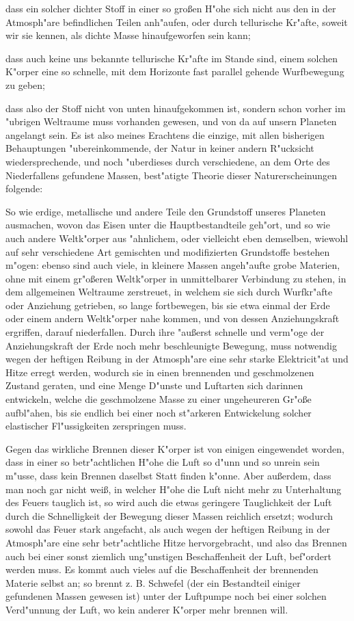 \documentclass[a4paper, 11pt, oneside, polutonikogreek, german]{article}
\begin{document}
dass ein solcher dichter Stoff in einer so großen H"ohe sich nicht aus den in der Atmosph"are befindlichen Teilen anh"aufen, oder durch tellurische Kr"afte, soweit wir sie kennen, als dichte Masse hinaufgeworfen sein kann;

dass auch keine uns bekannte tellurische Kr"afte im Stande sind, einem solchen K"orper eine so schnelle, mit dem Horizonte fast parallel gehende Wurfbewegung zu geben;

dass also der Stoff nicht von unten hinaufgekommen ist, sondern schon vorher im "ubrigen Weltraume muss vorhanden gewesen, und von da auf unsern Planeten angelangt sein. Es ist also meines Erachtens die einzige, mit allen bisherigen Behauptungen "ubereinkommende, der Natur in keiner andern R"ucksicht wiedersprechende, und noch "uberdieses durch verschiedene, an dem Orte des Niederfallens gefundene Massen, best"atigte Theorie dieser Naturerscheinungen folgende:

So wie erdige, metallische und andere Teile den Grundstoff unseres Planeten ausmachen, wovon das Eisen unter die Hauptbestandteile geh"ort, und so wie auch andere Weltk"orper aus "ahnlichem, oder vielleicht eben demselben, wiewohl auf sehr verschiedene Art gemischten und modifizierten Grundstoffe bestehen m"ogen: ebenso sind auch viele, in kleinere Massen angeh"aufte grobe Materien, ohne mit einem gr"oßeren Weltk"orper in unmittelbarer Verbindung zu stehen, in dem allgemeinen Weltraume zerstreuet, in welchem sie sich durch Wurfkr"afte oder Anziehung getrieben, so lange fortbewegen, bis sie etwa einmal der Erde oder einem andern Weltk"orper nahe kommen, und von dessen Anziehungskraft ergriffen, darauf niederfallen. Durch ihre "außerst schnelle und verm"oge der Anziehungskraft der Erde noch mehr beschleunigte Bewegung, muss notwendig wegen der heftigen Reibung in der Atmosph"are eine sehr starke Elektricit"at und Hitze erregt werden, wodurch sie in einen brennenden und geschmolzenen Zustand geraten, und eine Menge D"unste und Luftarten sich darinnen entwickeln, welche die geschmolzene Masse zu einer ungeheureren Gr"oße aufbl"ahen, bis sie endlich bei einer noch st"arkeren Entwickelung solcher elastischer Fl"ussigkeiten zerspringen muss.

Gegen das wirkliche Brennen dieser K"orper ist von einigen eingewendet worden, dass in einer so betr"achtlichen H"ohe die Luft so d"unn und so unrein sein m"usse, dass kein Brennen daselbst Statt finden k"onne. Aber außerdem, dass man noch gar nicht weiß, in welcher H"ohe die Luft nicht mehr zu Unterhaltung des Feuers tauglich ist, so wird auch die etwas geringere Tauglichkeit der Luft durch die Schnelligkeit der Bewegung dieser Massen reichlich ersetzt; wodurch sowohl das Feuer stark angefacht, als auch wegen der heftigen Reibung in der Atmosph"are eine sehr betr"achtliche Hitze hervorgebracht, und also das Brennen auch bei einer sonst ziemlich ung"unstigen Beschaffenheit der Luft, bef"ordert werden muss. Es kommt auch vieles auf die Beschaffenheit der brennenden Materie selbst an; so brennt z. B. Schwefel (der ein Bestandteil einiger gefundenen Massen gewesen ist) unter der Luftpumpe noch bei einer solchen Verd"unnung der Luft, wo kein anderer K"orper mehr brennen will.
\clearpage
\end{document}
